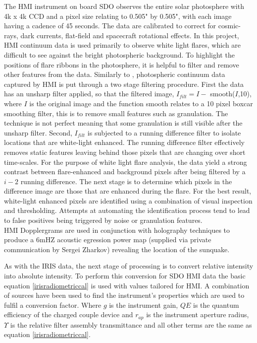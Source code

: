 The HMI instrument on board SDO observes the entire solar photosphere with 4k x 4k CCD and a pixel size relating to 0.505" by 0.505", with each image having a cadence of 45 seconds. The data are calibrated to correct for cosmic-rays, dark currents, flat-field and spacecraft rotational effects. In this project, HMI continuum data is used primarily to observe white light flares, which are difficult to see against the bright photospheric background. To highlight the positions of flare ribbons in the photosphere, it is helpful to filter and remove other features from the data. Similarly to \cite{2014ApJ...783...98K}, photospheric continuum data captured by HMI is put through a two stage filtering procedure. First the data has an unsharp filter applied, so that the filtered image, $I_{filt}=I-$ smooth($I$,10), where $I$ is the original image and the function smooth relates to a 10 pixel boxcar smoothing filter, this is to remove small features such as granulation. The technique is not perfect meaning that some granulation is still visible after the unsharp filter. Second, $I_{filt}$ is subjected to a running difference filter to isolate locations that are white-light enhanced. The running difference filter effectively removes static features leaving behind those pixels that are changing over short time-scales. For the purpose of white light flare analysis, the data yield a strong contrast between flare-enhanced and background pixels after being filtered by a $i-2$ running difference. The next stage is to determine which pixels in the difference image are those that are enhanced during the flare. For the best result, white-light enhanced pixels are identified using a combination of visual inspection and thresholding. Attempts at automating the identification process tend to lead to false positives being triggered by noise or granulation features. \\
HMI Dopplergrams are used in conjunction with holography techniques to produce a 6mHZ acoustic egression power map (supplied via private communication by Sergei Zharkov) revealing the location of the sunquake. 

As with the IRIS data, the next stage of processing is to convert relative intensity into absolute intensity. To perform this conversion for SDO HMI data the basic equation \ref{irisradiometriccal} is used with values tailored for HMI. A combination of sources \citep{2012SoPh..275...41B, 2012SoPh..275..285C} have been used to find the instrument's properties which are used to fulfil a conversion factor. Where $g$ is the instrument gain, $QE$ is the quantum efficiency of the charged couple device and $r_{ap}$ is the instrument aperture radius, $\Upsilon$ is the relative filter assembly transmittance and all other terms are the same as equation \ref{irisradiometriccal}.


